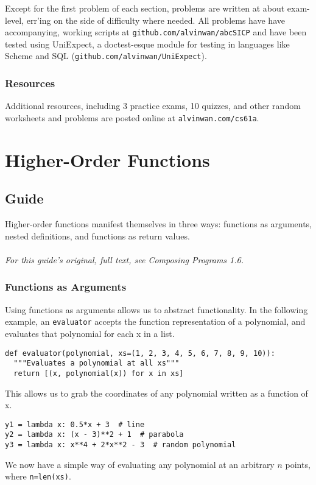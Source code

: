 \documentclass[a4paper]{book}
\begin{document}
Except for the first problem of each section, problems are written at about exam-level, err'ing on the side of difficulty where needed. All problems have have accompanying, working scripts at {\tt github.com/alvinwan/abcSICP} and have been tested using UniExpect, a doctest-esque module for testing in languages like Scheme and SQL ({\tt github.com/alvinwan/UniExpect}).

\subsection{Resources}

Additional resources, including 3 practice exams, 10 quizzes, and other random worksheets and problems are posted online at {\tt alvinwan.com/cs61a}.

\chapter{Higher-Order Functions}

\section{Guide}

Higher-order functions manifest themselves in three ways: functions  as arguments, nested definitions, and functions as return values.
\\
\\
\textit{For this guide's original, full text, see Composing Programs 1.6.}

\subsection{Functions as Arguments}

Using functions as arguments allows us to abstract functionality. In the following example, an {\tt evaluator} accepts the function representation of a polynomial, and evaluates that polynomial for each x in a list.
\begin{lstlisting}
def evaluator(polynomial, xs=(1, 2, 3, 4, 5, 6, 7, 8, 9, 10)):
  """Evaluates a polynomial at all xs"""
  return [(x, polynomial(x)) for x in xs]
\end{lstlisting}
This allows us to grab the coordinates of any polynomial written as a function of x.
\begin{lstlisting}
y1 = lambda x: 0.5*x + 3  # line
y2 = lambda x: (x - 3)**2 + 1  # parabola
y3 = lambda x: x**4 + 2*x**2 - 3  # random polynomial
\end{lstlisting}
We now have a simple way of evaluating any polynomial at an arbitrary $n$ points, where {\tt n=len(xs)}.
\end{document}

